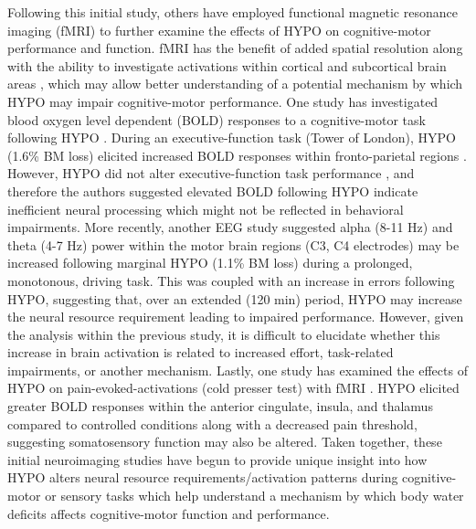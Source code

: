 Following this initial study, others have employed functional magnetic resonance imaging (fMRI) to further examine the effects of HYPO on cognitive-motor performance and function. fMRI has the benefit of added spatial resolution along with the ability to investigate activations within cortical and subcortical brain areas \cite{mehta_neuroergonomics:_2013}, which may allow better understanding of a potential mechanism by which HYPO may impair cognitive-motor performance. One study has investigated blood oxygen level dependent (BOLD) responses to a cognitive-motor task following HYPO \cite{kempton_dehydration_2011}. During an executive-function task (Tower of London), HYPO (1.6\% BM loss) elicited increased BOLD responses within fronto-parietal regions \cite{kempton_dehydration_2011}. However, HYPO did not alter executive-function task performance \cite{kempton_dehydration_2011}, and therefore the authors suggested elevated BOLD following HYPO indicate inefficient neural processing which might not be reflected in behavioral impairments. More recently, another EEG study \cite{watson_mild_2015} suggested alpha (8-11 Hz) and theta (4-7 Hz) power within the motor brain regions (C3, C4 electrodes) may be increased following marginal HYPO (1.1\% BM loss) during a prolonged, monotonous, driving task. This was coupled with an increase in errors following HYPO, suggesting that, over an extended (120 min) period, HYPO may increase the neural resource requirement leading to impaired performance. However, given the analysis within the previous study, it is difficult to elucidate whether this increase in brain activation is related to increased effort, task-related impairments, or another mechanism. Lastly, one study has examined the effects of HYPO on pain-evoked-activations (cold presser test) with fMRI \cite{ogino_dehydration_2014}. HYPO elicited greater BOLD responses within the anterior cingulate, insula, and thalamus compared to controlled conditions along with a decreased pain threshold, suggesting somatosensory function may also be altered. Taken together, these initial neuroimaging studies have begun to provide unique insight into how HYPO alters neural resource requirements/activation patterns during cognitive-motor or sensory tasks which help understand a mechanism by which body water deficits affects cognitive-motor function and performance.

